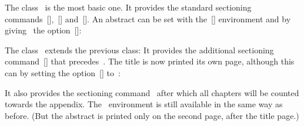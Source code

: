 The class~ is the most basic one.
It provides the standard sectioning commands~[\comname],~[\comname] and~[\comname].
An abstract can be set with the~[\envname] environment and by giving~ the option~[\envname]:

The class~ extends the previous class:
It provides the additional sectioning command~[\comname] that precedes~.
The title is now printed its own page, although this can by setting the option~[\optname] to~:
It also provides the sectioning command~ after which all chapters will be counted towards the appendix.
The~ environment is still available in the same way as before.
(But the abstract is printed only on the second page, after the title page.)

